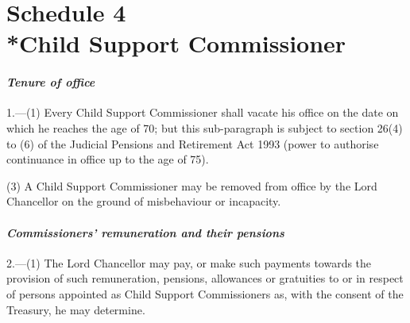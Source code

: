 \documentclass[12pt,a4paper]{article}
\begin{document}
\part[Schedule 4 --- Child Support Commissioners]{Schedule 4\\*Child Support Commissioner}

\renewcommand\parthead{--- Schedule 4}


\subsection*{\itshape Tenure of office}

1.---(1) Every Child Support Commissioner shall vacate his office 
on the date on which he reaches the age of 70; but this sub-paragraph is subject to section 26(4) to (6) of the Judicial Pensions and Retirement Act 1993 (power to authorise continuance in office up to the age of 75).  %


(3) A Child Support Commissioner may be removed from office by the Lord Chancellor on the ground of misbehaviour or incapacity.


\subsection*{\itshape Commissioners' remuneration and their pensions}

2.---(1) The Lord Chancellor may pay, or make such payments towards the provision of such remuneration, pensions, allowances or gratuities to or in respect of persons appointed as Child Support Commissioners as, with the consent of the Treasury, he may determine.
\end{document}
